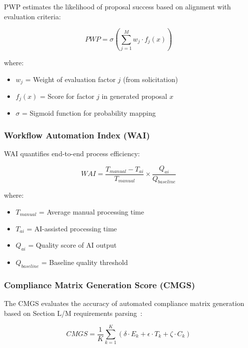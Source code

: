 \documentclass[11pt,a4paper]{article}
\begin{document}
PWP estimates the likelihood of proposal success based on alignment with evaluation criteria:

\begin{equation}
PWP = \sigma\left(\sum_{j=1}^{M} w_j \cdot f_j(x)\right)
\end{equation}

where:
\begin{itemize}
    \item $w_j$ = Weight of evaluation factor $j$ (from solicitation)
    \item $f_j(x)$ = Score for factor $j$ in generated proposal $x$
    \item $\sigma$ = Sigmoid function for probability mapping
\end{itemize}

\subsubsection{Workflow Automation Index (WAI)}

WAI quantifies end-to-end process efficiency:

\begin{equation}
WAI = \frac{T_{manual} - T_{ai}}{T_{manual}} \times \frac{Q_{ai}}{Q_{baseline}}
\end{equation}

where:
\begin{itemize}
    \item $T_{manual}$ = Average manual processing time
    \item $T_{ai}$ = AI-assisted processing time
    \item $Q_{ai}$ = Quality score of AI output
    \item $Q_{baseline}$ = Baseline quality threshold
\end{itemize}

\subsubsection{Compliance Matrix Generation Score (CMGS)}

The CMGS evaluates the accuracy of automated compliance matrix generation based on Section L/M requirements parsing~\citep{far2025}:

\begin{equation}
CMGS = \frac{1}{K} \sum_{k=1}^{K} \left( \delta \cdot E_k + \epsilon \cdot T_k + \zeta \cdot C_k \right)
\end{equation}
\end{document}
